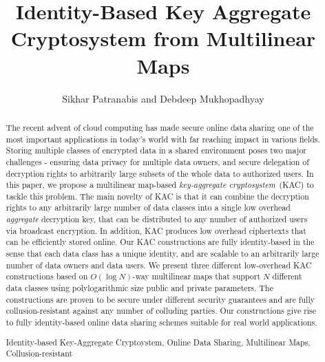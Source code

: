 \documentclass{class/llncs}
\title{Identity-Based Key Aggregate Cryptosystem from Multilinear Maps}
\begin{document}
% 

\author{Sikhar Patranabis and Debdeep Mukhopadhyay}
\maketitle
{}


\begin{abstract}

The recent advent of cloud computing has made secure online data sharing one of the most important applications in today's world with far reaching impact in various fields. Storing multiple classes of encrypted data in a shared environment poses two major challenges - ensuring data privacy for multiple data owners, and secure delegation of decryption rights to arbitrarily large subsets of the whole data to authorized users. In this paper, we propose a multilinear map-based \emph{key-aggregate cryptosystem}~(KAC) to tackle this problem. The main novelty of KAC is that it can combine the decryption rights to any arbitrarily large number of data classes into a single low overhead \emph{aggregate} decryption key, that can be distributed to any number of authorized users via broadcast encryption. In addition, KAC produces low overhead ciphertexts that can be efficiently stored online. Our KAC constructions are fully identity-based in the sense that each data class has a unique identity, and are scalable to an arbitrarily large number of data owners and data users. We present three different low-overhead KAC constructions based on $O(\log N)$-way multilinear maps that support $N$ different data classes using polylogarithmic size public and private parameters. The constructions are proven to be secure under different security guarantees and are fully collusion-resistant against any number of colluding parties. Our constructions give rise to fully identity-based online data sharing schemes suitable for real world applications.

 Identity-based Key-Aggregate Cryptoystem, Online Data Sharing, Multilinear Maps, Collusion-resistant
\end{abstract}












\newpage

\end{document}
